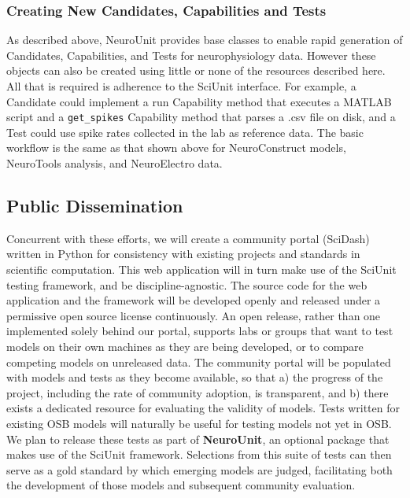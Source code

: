 \documentclass[11pt,letterpaper]{article}
\begin{document}
\subsubsection{Creating New Candidates, Capabilities and Tests}
As described above, NeuroUnit provides base classes to enable rapid generation of Candidates, Capabilities, and Tests for neurophysiology data.  However these objects can also be created using little or none of the resources described here.  All that is required is adherence to the SciUnit interface.  For example, a Candidate could implement a run Capability method that executes a MATLAB script and a \verb|get_spikes| Capability method that parses a .csv file on disk, and a Test could use spike rates collected in the lab as reference data. The basic workflow is the same as that shown above for NeuroConstruct models, NeuroTools analysis, and NeuroElectro data. 

\subsection{Public Dissemination}
Concurrent with these efforts, we will create a community portal (SciDash) written in Python for consistency with existing projects and standards in scientific computation.  This web application will in turn make use of the SciUnit testing framework, and be discipline-agnostic.  The source code for the web application and the framework will be developed openly and released under a permissive open source license continuously. An open release, rather than one implemented solely behind our portal, supports labs or groups that want to test models on their own machines as they are being developed, or to compare competing models on unreleased data.  The community portal will be populated with models and tests as they become available, so that a) the progress of the project, including the rate of community adoption, is transparent, and b) there exists a dedicated resource for evaluating the validity of models.  
	Tests written for existing OSB models will naturally be useful for testing models not yet in OSB.  We plan to release these tests as part of \textbf{NeuroUnit}, an optional package that makes use of the SciUnit framework.  Selections from this suite of tests can then serve as a gold standard by which emerging models are judged, facilitating both the development of those models and subsequent community evaluation.  
\end{document}
